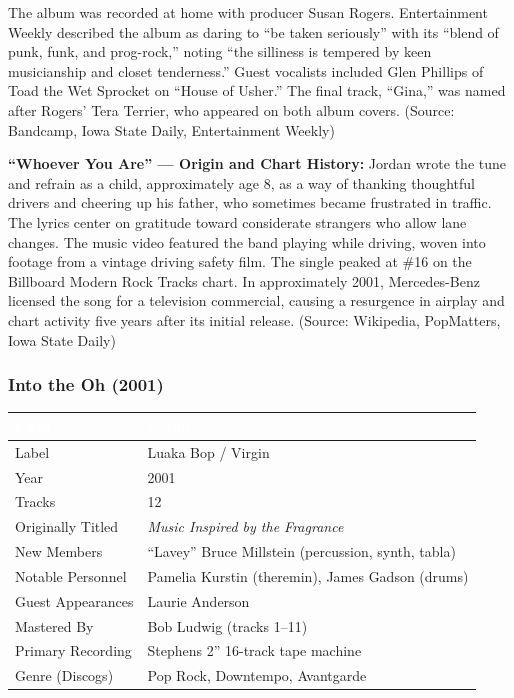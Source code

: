 \documentclass[11pt,letterpaper]{article}
\newcommand{\tableheader}[1]{\textbf{\sffamily\textcolor{white}{#1}}}
\begin{document}
The album was recorded at home with producer Susan Rogers. Entertainment Weekly described the album as daring to ``be taken seriously'' with its ``blend of punk, funk, and prog-rock,'' noting ``the silliness is tempered by keen musicianship and closet tenderness.'' Guest vocalists included Glen Phillips of Toad the Wet Sprocket on ``House of Usher.'' The final track, ``Gina,'' was named after Rogers' Tera Terrier, who appeared on both album covers. (Source: Bandcamp, Iowa State Daily, Entertainment Weekly)

\textbf{``Whoever You Are'' --- Origin and Chart History:} Jordan wrote the tune and refrain as a child, approximately age 8, as a way of thanking thoughtful drivers and cheering up his father, who sometimes became frustrated in traffic. The lyrics center on gratitude toward considerate strangers who allow lane changes. The music video featured the band playing while driving, woven into footage from a vintage driving safety film. The single peaked at \#16 on the Billboard Modern Rock Tracks chart. In approximately 2001, Mercedes-Benz licensed the song for a television commercial, causing a resurgence in airplay and chart activity five years after its initial release. (Source: Wikipedia, PopMatters, Iowa State Daily)

\subsubsection{Into the Oh (2001)}

\begin{center}
\begin{tabularx}{\textwidth}{L{3cm}X}
\toprule
{}
\tableheader{Field} & \tableheader{Detail} \\
\midrule
Label & Luaka Bop / Virgin \\
Year & 2001 \\
Tracks & 12 \\
Originally Titled & \textit{Music Inspired by the Fragrance} \\
New Members & ``Lavey'' Bruce Millstein (percussion, synth, tabla) \\
Notable Personnel & Pamelia Kurstin (theremin), James Gadson (drums) \\
Guest Appearances & Laurie Anderson \\
Mastered By & Bob Ludwig (tracks 1--11) \\
Primary Recording & Stephens 2'' 16-track tape machine \\
Genre (Discogs) & Pop Rock, Downtempo, Avantgarde \\
\bottomrule
\end{tabularx}
\end{center}
\end{document}
